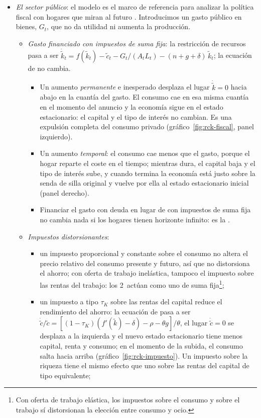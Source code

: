 \documentclass[11pt]{article}
\begin{document}
\begin{itemize}
\item \emph{El sector público}: el modelo es el marco de referencia para analizar la política fiscal con hogares que miran al futuro . Introducimos un gasto público en bienes, $G_t$, que no da utilidad ni aumenta la producción.
  \begin{itemize}
  \item \emph{Gasto financiado con impuestos de suma fija}: la restricción de recursos pasa a ser $\dot{\tilde k}_t=f(\tilde k_t)-\tilde c_t-G_t/(A_tL_t)-(n+g+\delta)\,\tilde k_t$; la ecuación de  no cambia.
    \begin{itemize}
    \item Un aumento \emph{permanente} e inesperado desplaza el lugar $\dot{\tilde k}=0$ hacia abajo en la cuantía del gasto. El consumo cae en esa misma cuantía en el momento del anuncio y la economía sigue en el estado estacionario: el capital y el tipo de interés no cambian. Es una expulsión completa del consumo privado (gráfico~\ref{fig:rck-fiscal}, panel izquierdo).
    \item Un aumento \emph{temporal}: el consumo cae menos que el gasto, porque el hogar reparte el coste en el tiempo; mientras dura, el capital baja y el tipo de interés sube, y cuando termina la economía está justo sobre la senda de silla original y vuelve por ella al estado estacionario inicial (panel derecho).
    \item Financiar el gasto con deuda en lugar de con impuestos de suma fija no cambia nada si los hogares tienen horizonte infinito: es la \nocite{Barro1974} .
    \end{itemize}
  \item \emph{Impuestos distorsionantes}:
    \begin{itemize}
    \item un impuesto proporcional y constante sobre el consumo no altera el precio relativo del consumo presente y futuro, así que no distorsiona el ahorro; con oferta de trabajo inelástica, tampoco el impuesto sobre las rentas del trabajo: los 2~actúan como uno de suma fija\footnote{Con oferta de trabajo elástica, los impuestos sobre el consumo y sobre el trabajo sí distorsionan la elección entre consumo y ocio.};
    \item un impuesto a tipo $\tau_K$ sobre las rentas del capital reduce el rendimiento del ahorro: la ecuación de  pasa a ser $\dot{\tilde c}/\tilde c=[(1-\tau_K)(f'(\tilde k)-\delta)-\rho-\theta g]/\theta$, el lugar $\dot{\tilde c}=0$ se desplaza a la izquierda y el nuevo estado estacionario tiene menos capital, renta y consumo; en el momento de la subida, el consumo salta hacia arriba (gráfico~\ref{fig:rck-impuesto}). Un impuesto sobre la riqueza tiene el mismo efecto que uno sobre las rentas del capital de tipo equivalente;

\end{itemize}
\end{itemize}
\end{itemize}
\end{document}
